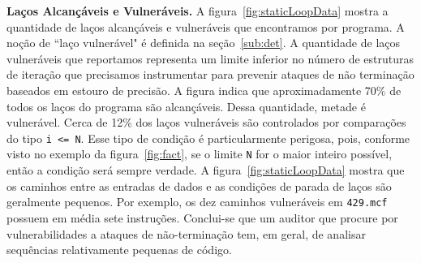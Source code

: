 \documentclass{llncs}
\begin{document}
\noindent
\textbf{Laços Alcançáveis e Vulneráveis. }
A figura~\ref{fig:staticLoopData} mostra a quantidade de laços alcançáveis e
vulneráveis que encontramos por programa.
A noção de ``laço vulnerável" é definida na seção~\ref{sub:det}.
A quantidade de laços vulneráveis que reportamos representa um limite inferior
no número de estruturas de iteração que precisamos instrumentar para prevenir
ataques de não terminação baseados em estouro de precisão.
A figura indica que aproximadamente 70\% de todos os laços do programa
são alcançáveis.
Dessa quantidade, metade é vulnerável.
Cerca de 12\% dos laços vulneráveis são controlados por comparações do
tipo \texttt{i <= N}.
Esse tipo de condição é particularmente perigosa, pois, conforme visto no
exemplo da figura~\ref{fig:fact}, se o limite \texttt{N} for o
maior inteiro possível, então a condição será sempre verdade.
A figura~\ref{fig:staticLoopData} mostra que os caminhos entre as entradas de
dados e as condições de parada de laços são geralmente pequenos.
Por exemplo, os dez caminhos vulneráveis em \texttt{429.mcf} possuem em média
sete instruções.
Conclui-se que um auditor que procure por vulnerabilidades a ataques de
não-terminação tem, em geral, de analisar sequências relativamente
pequenas de código.
\end{document}
